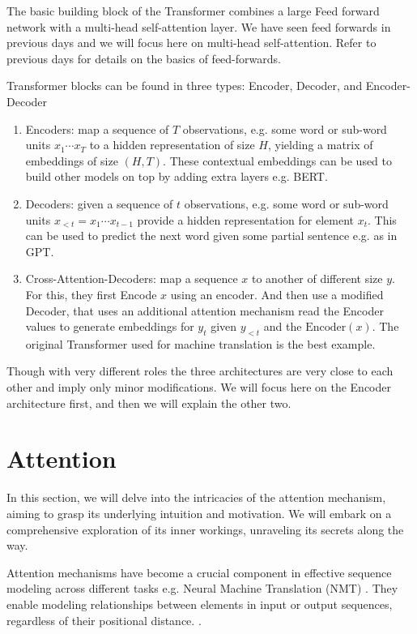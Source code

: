 The basic building block of the Transformer combines a large Feed forward network with a multi-head self-attention layer. We have seen feed forwards in previous days and we will focus here on multi-head self-attention. Refer to previous days for details on the basics of feed-forwards.

Transformer blocks can be found in three types: Encoder, Decoder, and Encoder-Decoder 

\begin{enumerate}
\item Encoders: map a sequence of $T$ observations, e.g. some word or sub-word units $x_1 \cdots x_T$ to a hidden representation of size $H$, yielding a matrix of embeddings of size $(H, T)$. These contextual embeddings can be used to build other models on top by adding extra layers e.g. BERT.
\item Decoders: given a sequence of $t$ observations, e.g. some word or sub-word units $x_{<t} = x_1 \cdots x_{t-1}$ provide a hidden representation for element $x_t$. This can be used to predict the next word given some partial sentence e.g. as in GPT. 
\item Cross-Attention-Decoders: map a sequence $x$ to another of different size $y$. For this, they first Encode $x$ using an encoder. And then use a modified Decoder, that uses an additional attention mechanism read the Encoder values to generate embeddings for $y_t$ given $y_{<t}$ and the $\mathrm{Encoder}(x)$. The original Transformer used for machine translation is the best example.
\end{enumerate}

Though with very different roles the three architectures are very close to each other and imply only minor modifications. We will focus here on the Encoder architecture first, and then we will explain the other two.

\section{Attention}
In this section, we will delve into the intricacies of the attention mechanism, aiming to grasp its underlying intuition and motivation. We will embark on a comprehensive exploration of its inner workings, unraveling its secrets along the way.

Attention mechanisms have become a crucial component in effective sequence modeling across different tasks e.g. Neural Machine Translation (NMT) \cite{vaswani2017attention}. They enable modeling relationships between elements in input or output sequences, regardless of their positional distance. \cite{bahdanau2014neural, kim2017structured}.

